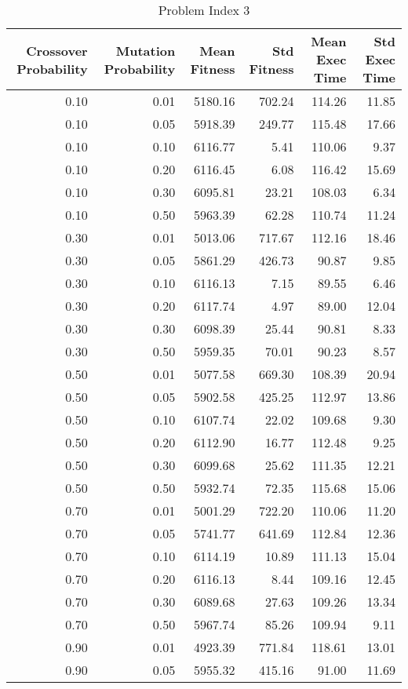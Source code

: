 \begin{table}
\caption{Problem Index 3}
\label{tab:problem_3}
\begin{tabular}{rrrrrr}
\toprule
Crossover Probability & Mutation Probability & Mean Fitness & Std Fitness & Mean Exec Time & Std Exec Time \\
\midrule
0.10 & 0.01 & 5180.16 & 702.24 & 114.26 & 11.85 \\
0.10 & 0.05 & 5918.39 & 249.77 & 115.48 & 17.66 \\
0.10 & 0.10 & 6116.77 & 5.41 & 110.06 & 9.37 \\
0.10 & 0.20 & 6116.45 & 6.08 & 116.42 & 15.69 \\
0.10 & 0.30 & 6095.81 & 23.21 & 108.03 & 6.34 \\
0.10 & 0.50 & 5963.39 & 62.28 & 110.74 & 11.24 \\
0.30 & 0.01 & 5013.06 & 717.67 & 112.16 & 18.46 \\
0.30 & 0.05 & 5861.29 & 426.73 & 90.87 & 9.85 \\
0.30 & 0.10 & 6116.13 & 7.15 & 89.55 & 6.46 \\
0.30 & 0.20 & 6117.74 & 4.97 & 89.00 & 12.04 \\
0.30 & 0.30 & 6098.39 & 25.44 & 90.81 & 8.33 \\
0.30 & 0.50 & 5959.35 & 70.01 & 90.23 & 8.57 \\
0.50 & 0.01 & 5077.58 & 669.30 & 108.39 & 20.94 \\
0.50 & 0.05 & 5902.58 & 425.25 & 112.97 & 13.86 \\
0.50 & 0.10 & 6107.74 & 22.02 & 109.68 & 9.30 \\
0.50 & 0.20 & 6112.90 & 16.77 & 112.48 & 9.25 \\
0.50 & 0.30 & 6099.68 & 25.62 & 111.35 & 12.21 \\
0.50 & 0.50 & 5932.74 & 72.35 & 115.68 & 15.06 \\
0.70 & 0.01 & 5001.29 & 722.20 & 110.06 & 11.20 \\
0.70 & 0.05 & 5741.77 & 641.69 & 112.84 & 12.36 \\
0.70 & 0.10 & 6114.19 & 10.89 & 111.13 & 15.04 \\
0.70 & 0.20 & 6116.13 & 8.44 & 109.16 & 12.45 \\
0.70 & 0.30 & 6089.68 & 27.63 & 109.26 & 13.34 \\
0.70 & 0.50 & 5967.74 & 85.26 & 109.94 & 9.11 \\
0.90 & 0.01 & 4923.39 & 771.84 & 118.61 & 13.01 \\
0.90 & 0.05 & 5955.32 & 415.16 & 91.00 & 11.69 \\

\end{tabular}
\end{table}
